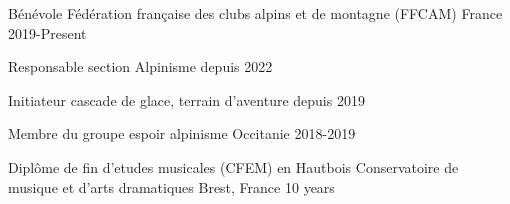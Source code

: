

\begin{cventries}
  \cventry
    {Bénévole} %
    {Fédération française des clubs alpins et de montagne (FFCAM)} %
    {France} %
    {2019-Present} %
    {
      \begin{cvitems} %
        \item Responsable section Alpinisme depuis 2022
        \item Initiateur cascade de glace, terrain d'aventure depuis 2019
        \item Membre du groupe espoir alpinisme Occitanie 2018-2019
      \end{cvitems}
    }

  \cventry
  {Diplôme de fin d'etudes musicales (CFEM) en Hautbois} %
    {Conservatoire de musique et d'arts dramatiques} %
    {Brest, France} %
    {10 years} %
    { }
\end{cventries}
